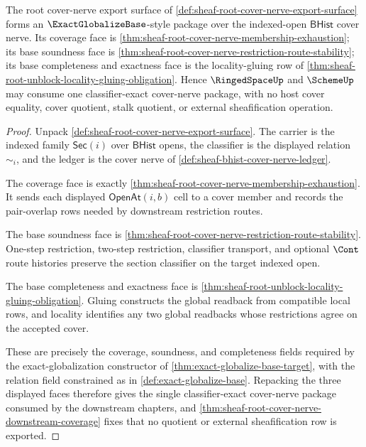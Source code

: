 \begin{theorem}
\label{thm:sheaf-root-cover-nerve-exact-globalize-package}
The root cover-nerve export surface of \autoref{def:sheaf-root-cover-nerve-export-surface} forms an $\ExactGlobalizeBase$-style package over the indexed-open $\mathsf{BHist}$ cover nerve. Its coverage face is \autoref{thm:sheaf-root-cover-nerve-membership-exhaustion}; its base soundness face is \autoref{thm:sheaf-root-cover-nerve-restriction-route-stability}; its base completeness and exactness face is the locality-gluing row of \autoref{thm:sheaf-root-unblock-locality-gluing-obligation}. Hence $\RingedSpaceUp$ and $\SchemeUp$ may consume one classifier-exact cover-nerve package, with no host cover equality, cover quotient, stalk quotient, or external sheafification operation.
\end{theorem}
\begin{proof}
Unpack \autoref{def:sheaf-root-cover-nerve-export-surface}. The carrier is the indexed family $\mathsf{Sec}(i)$ over $\mathsf{BHist}$ opens, the classifier is the displayed relation $\sim_i$, and the ledger is the cover nerve of \autoref{def:sheaf-bhist-cover-nerve-ledger}.

The coverage face is exactly \autoref{thm:sheaf-root-cover-nerve-membership-exhaustion}. It sends each displayed $\mathsf{OpenAt}(i,b)$ cell to a cover member and records the pair-overlap rows needed by downstream restriction routes.

The base soundness face is \autoref{thm:sheaf-root-cover-nerve-restriction-route-stability}. One-step restriction, two-step restriction, classifier transport, and optional $\Cont$ route histories preserve the section classifier on the target indexed open.

The base completeness and exactness face is \autoref{thm:sheaf-root-unblock-locality-gluing-obligation}. Gluing constructs the global readback from compatible local rows, and locality identifies any two global readbacks whose restrictions agree on the accepted cover.

These are precisely the coverage, soundness, and completeness fields required by the exact-globalization constructor of \autoref{thm:exact-globalize-base-target}, with the relation field constrained as in \autoref{def:exact-globalize-base}. Repacking the three displayed faces therefore gives the single classifier-exact cover-nerve package consumed by the downstream chapters, and \autoref{thm:sheaf-root-cover-nerve-downstream-coverage} fixes that no quotient or external sheafification row is exported.
\end{proof}
